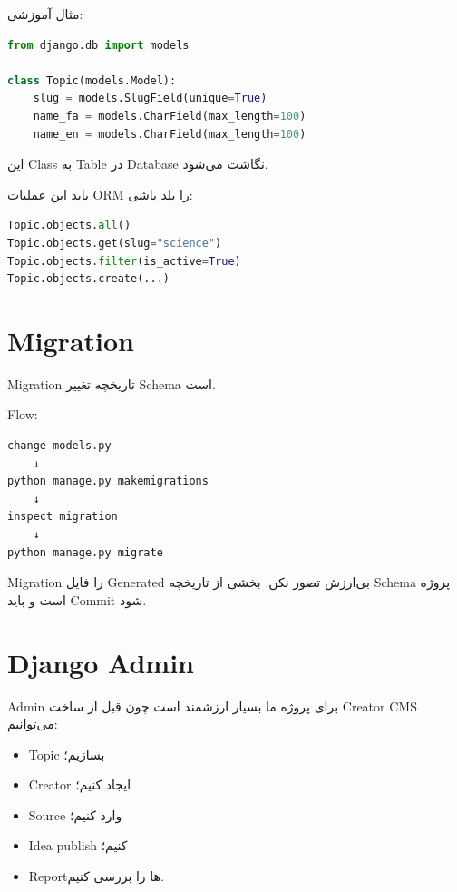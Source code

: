 مثال آموزشی:
\begin{latin}
\begin{lstlisting}[language=Python]
from django.db import models

class Topic(models.Model):
    slug = models.SlugField(unique=True)
    name_fa = models.CharField(max_length=100)
    name_en = models.CharField(max_length=100)
\end{lstlisting}
\end{latin}

این Class به Table در Database نگاشت می‌شود.

باید این عملیات ORM را بلد باشی:
\begin{latin}
\begin{lstlisting}[language=Python]
Topic.objects.all()
Topic.objects.get(slug="science")
Topic.objects.filter(is_active=True)
Topic.objects.create(...)
\end{lstlisting}
\end{latin}

\section{Migration}

Migration تاریخچه تغییر Schema است.

Flow:
\begin{latin}
\begin{lstlisting}
change models.py
    ↓
python manage.py makemigrations
    ↓
inspect migration
    ↓
python manage.py migrate
\end{lstlisting}
\end{latin}

\begin{warningbox}
Migration را فایل Generated بی‌ارزش تصور نکن. بخشی از تاریخچه Schema پروژه است و باید Commit شود.
\end{warningbox}

\section{Django Admin}

Admin برای پروژه ما بسیار ارزشمند است چون قبل از ساخت Creator CMS می‌توانیم:
\begin{itemize}
  \item Topic بسازیم؛
  \item Creator ایجاد کنیم؛
  \item Source وارد کنیم؛
  \item Idea publish کنیم؛
  \item Reportها را بررسی کنیم.
\end{itemize}

